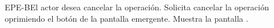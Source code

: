 		\begin{UCtrayectoriaA}{EPE-B}{El actor desea cancelar la operación.}
			\UCpaso[\UCactor] Solicita cancelar la operación oprimiendo el botón  de la pantalla emergente.
			\UCpaso[\UCsist] Muestra la pantalla .
		\end{UCtrayectoriaA}
